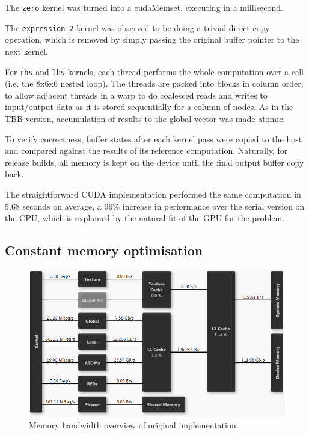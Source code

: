 \documentclass[11pt, oneside, a4paper]{article}
\begin{document}
The \texttt{zero} kernel was turned into a cudaMemset, executing in a millisecond.

The \texttt{expression 2} kernel was observed to be doing a trivial direct copy operation, which is removed by simply passing the original buffer pointer to the next kernel.

For \texttt{rhs} and \texttt{lhs} kernels, each thread performs the whole computation over a cell (i.e. the 8x6x6 nested loop). The threads are packed into blocks in column order, to allow adjacent threads in a warp to do coalesced reads and writes to input/output data as it is stored sequentially for a column of nodes. As in the TBB version, accumulation of results to the global vector was made atomic.

To verify correctness, buffer states after each kernel pass were copied to the host and compared against the results of its reference computation. Naturally, for release builds, all memory is kept on the device until the final output buffer copy back.

The straightforward CUDA implementation performed the same computation in 5.68 seconds on average, a 96\% increase in performance over the serial version on the CPU, which is explained by the natural fit of the GPU for the problem.


\subsection{Constant memory optimisation} %
\label{sub:constant_memory_optimisation}

\begin{figure}[tb]
	\begin{center}
		\includegraphics[width=\textwidth]{"Original nonconst LHS memory overview BW"}
	\end{center}
	\caption{Memory bandwidth overview of original implementation.}
	\label{fig:membBWorig}
\end{figure}
\end{document}

